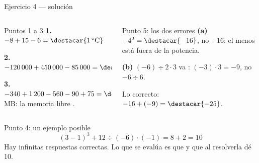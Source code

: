 \documentclass[aspectratio=169,10pt]{beamer}
\begin{document}
\begin{frame}{Ejercicio 4 — solución}
  \scriptsize
  \begin{columns}[T,onlytextwidth]
    \begin{column}{0.46\textwidth}
      \begin{block}{Puntos 1 a 3}
        \tiny
        \textbf{1.} $-8 + 15 - 6 = \destacar{1\,^\circ\text{C}}$

        \vspace{0.1cm}
        \textbf{2.} $-120\,000 + 450\,000 - 85\,000
        = \destacar{\$245\,000}$

        \vspace{0.1cm}
        \textbf{3.} $-340 + 1\,200 - 560 - 90 + 75 = \destacar{+285}$ MB:
        la memoria libre .
      \end{block}
    \end{column}
    \begin{column}{0.50\textwidth}
      \begin{alertblock}{Punto 5: los dos errores}
        \tiny
        \textbf{(a)} $-4^2 = \destacar{-16}$, no $+16$: el menos está fuera de
        la potencia.

        \vspace{0.08cm}
        \textbf{(b)} $(-6)\div 2\cdot 3$ va :
        $(-3)\cdot 3 = -9$, no $-6\div 6$.

        \vspace{0.08cm}
        Lo correcto: \ $-16 + (-9) = \destacar{-25}$.
      \end{alertblock}
    \end{column}
  \end{columns}

  \vspace{0.05cm}
  \begin{exampleblock}{Punto 4: un ejemplo posible}
    \tiny
    \[ (3-1)^3 + 12 \div (-6) \cdot (-1) = 8 + 2 = 10 \]
    Hay infinitas respuestas correctas. Lo que se evalúa es que
     y que al resolverla dé 10.
  \end{exampleblock}
\end{frame}
\end{document}
